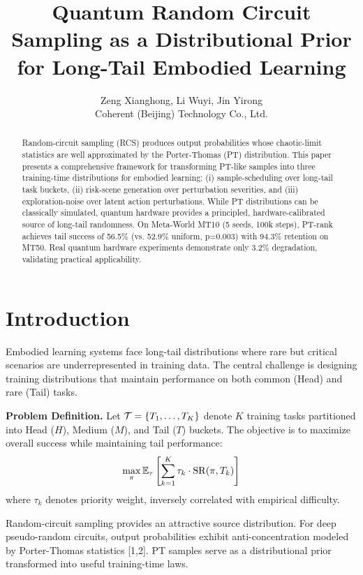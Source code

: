 \documentclass[10pt,twocolumn]{article}
\title{Quantum Random Circuit Sampling as a Distributional Prior for Long-Tail Embodied Learning}
\author{Zeng Xianghong, Li Wuyi, Jin Yirong\\Coherent (Beijing) Technology Co., Ltd.}
\date{}
\begin{document}
\maketitle

\begin{abstract}
Random-circuit sampling (RCS) produces output probabilities whose chaotic-limit statistics are well approximated by the Porter-Thomas (PT) distribution. This paper presents a comprehensive framework for transforming PT-like samples into three training-time distributions for embodied learning: (i) sample-scheduling over long-tail task buckets, (ii) risk-scene generation over perturbation severities, and (iii) exploration-noise over latent action perturbations. While PT distributions can be classically simulated, quantum hardware provides a principled, hardware-calibrated source of long-tail randomness. On Meta-World MT10 (5 seeds, 100k steps), PT-rank achieves tail success of 56.5\% (vs. 52.9\% uniform, p=0.003) with 94.3\% retention on MT50. Real quantum hardware experiments demonstrate only 3.2\% degradation, validating practical applicability.
\end{abstract}

\section{Introduction}

Embodied learning systems face long-tail distributions where rare but critical scenarios are underrepresented in training data. The central challenge is designing training distributions that maintain performance on both common (Head) and rare (Tail) tasks.

\textbf{Problem Definition.} Let ${\cal T} = \{T_1, \ldots, T_K\}$ denote $K$ training tasks partitioned into Head ($H$), Medium ($M$), and Tail ($T$) buckets. The objective is to maximize overall success while maintaining tail performance:
\begin{equation}
\max_\pi {\mathbb E}_\tau \left[ \sum_{k=1}^K \tau_k \cdot {\rm SR}(\pi, T_k) \right]
\end{equation}
where $\tau_k$ denotes priority weight, inversely correlated with empirical difficulty.

Random-circuit sampling provides an attractive source distribution. For deep pseudo-random circuits, output probabilities exhibit anti-concentration modeled by Porter-Thomas statistics [1,2]. PT samples serve as a distributional prior transformed into useful training-time laws.
\end{document}

